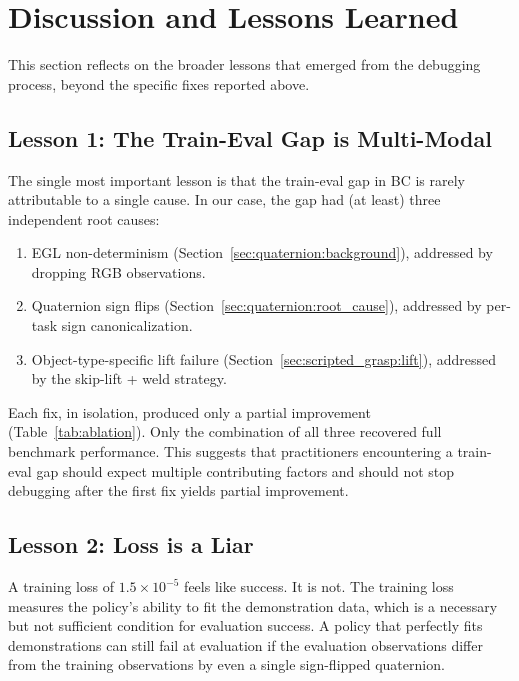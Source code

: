 \section{Discussion and Lessons Learned}
\label{sec:discussion}

This section reflects on the broader lessons that emerged from the debugging process, beyond the specific fixes reported above.

\subsection{Lesson 1: The Train-Eval Gap is Multi-Modal}
\label{sec:discussion:multimodal}

The single most important lesson is that the train-eval gap in BC is rarely attributable to a single cause. In our case, the gap had (at least) three independent root causes:
\begin{enumerate}[leftmargin=*,itemsep=2pt]
    \item EGL non-determinism (Section~\ref{sec:quaternion:background}), addressed by dropping RGB observations.
    \item Quaternion sign flips (Section~\ref{sec:quaternion:root_cause}), addressed by per-task sign canonicalization.
    \item Object-type-specific lift failure (Section~\ref{sec:scripted_grasp:lift}), addressed by the skip-lift + weld strategy.
\end{enumerate}

Each fix, in isolation, produced only a partial improvement (Table~\ref{tab:ablation}). Only the combination of all three recovered full benchmark performance. This suggests that practitioners encountering a train-eval gap should expect multiple contributing factors and should not stop debugging after the first fix yields partial improvement.

\subsection{Lesson 2: Loss is a Liar}
\label{sec:discussion:loss_lier}

A training loss of $1.5 \times 10^{-5}$ feels like success. It is not. The training loss measures the policy's ability to fit the demonstration data, which is a necessary but not sufficient condition for evaluation success. A policy that perfectly fits demonstrations can still fail at evaluation if the evaluation observations differ from the training observations by even a single sign-flipped quaternion.

